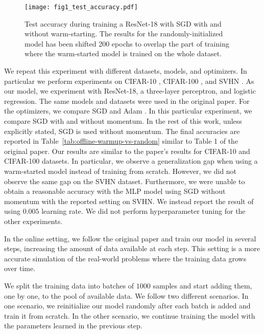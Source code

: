 \begin{wrapfigure}{r}{.45\linewidth}
    \texttt{[image: fig1\_test\_accuracy.pdf]}
    \caption{Test accuracy during training a ResNet-18 with SGD with and without warm-starting. The results for the randomly-initialized model has been shifted 200 epochs to overlap the part of training where the warm-started model is trained on the whole dataset. }
    \label{fig:offline-warmup-vs-random-CIFAR-10}
\end{wrapfigure}

We repeat this experiment with different datasets, models, and optimizers. In particular we perform experiments on CIFAR-10 \cite{hinton_learning_2007}, CIFAR-100 \cite{hinton_learning_2007}, and SVHN \cite{svhn}. As our model, we experiment with ResNet-18, a three-layer perceptron, and logistic regression. The same models and datasets were used in the original paper. For the optimizers, we compare SGD \cite{rumelhart_learning_1986} and Adam \cite{kingma_adam:_2015}. In this particular experiment, we compare SGD with and without momentum. In the rest of this work, unless explicitly stated, SGD is used without momentum. 
The final accuracies are reported in Table~\ref{tab:offline-warmup-vs-random} similar to Table 1 of the original paper. Our results are similar to the paper's results for CIFAR-10 and CIFAR-100 datasets. In particular, we observe a generalization gap when using a warm-started model instead of training from scratch. However, we did not observe the same gap on the SVHN dataset.  Furthermore, we were unable to obtain a reasonable accuracy with the MLP model using SGD without momentum with the reported setting on SVHN. We instead report the result of using $0.005$ learning rate. We did not perform hyperparameter tuning for the other experiments.

%




In the online setting, we follow the original paper and train our model in several steps, increasing the amount of data available at each step. This setting is a more accurate simulation of the real-world problems where the training data grows over time. 
%

%

We split the training data into batches of $1000$ samples and start adding them, one by one, to the pool of available data. We follow two different scenarios. In one scenario, we reinitialize our model randomly after each batch is added and train it from scratch. In the other scenario, we continue training the model with the parameters learned in the previous step. 


